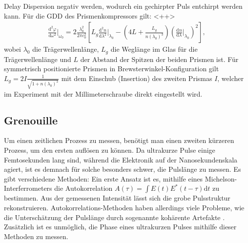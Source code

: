 \documentclass[twoside,        %
               BCOR12mm,       %
               english,ngerman, %
               fleqn,headsepline=false,footsepline=false
              ]{Vorlage/MFPREPORT}
\renewcommand{\d}{\ensuremath{\mathrm{d}}} %
\newcommand{\diff}[3][]{\ensuremath{\frac{\d^{#1}#2}{\d#3^{#1}}}} %
\begin{document}
Delay Dispersion negativ werden, wodurch ein gechirpter Puls entchirpt werden
kann. Für die GDD des Prismenkompressors gilt: \cite{Diels2006}<++> 
\begin{align}
    \diff[2]{\varphi}{\omega}|_{\omega_0}=2\frac{\lambda_0^2}{2\pi c_0^2}\left[
    L_g\diff[2]{n}{\lambda}|_{\lambda_0}-(4L+\frac{L_g}{n(\lambda_0)^3})(\diff{n}{\lambda}|_{\lambda_0})^2
    \right],
    \label{eq:pc}
\end{align}
wobei $\lambda_0$ die Trägerwellenlänge, $L_g$ die Weglänge im Glas für die
Trägerwellenlänge und $L$ der Abstand der Spitzen der beiden Prismen ist. Für
symmetrisch positionierte Prismen in Brewsterwinkel-Konfiguration gilt
$L_g=2I\frac{1}{\sqrt{1+n(\lambda_0)^2}}$ mit dem Einschub (Insertion) des
zweiten Prismas $I$, welcher im Experiment mit der Millimeterschraube direkt
eingestellt wird.

\subsection{Grenouille}
Um einen zeitlichen Prozess zu messen, benötigt man einen zweiten kürzeren Prozess, um
den ersten auflösen zu können. Da ultrakurze Pulse einige Femtosekunden lang
sind, während die Elektronik auf der Nanosekundenskala agiert, ist es demnach
für solche besonders schwer, die Pulslänge zu messen. 
Es gibt verschiedene Methoden: Ein erste Ansatz ist es, mithilfe eines
Michelson-Interferrometers die Autokorrelation $A(\tau)=\int E(t)E^*(t-\tau)\d
t$ zu bestimmen. Aus der gemessenen Intensität lässt sich die grobe
Pulsstruktur rekonstruieren. Autokorrelations-Methoden haben allerdings viele
Probleme, wie die Unterschätzung der Pulslänge durch sogenannte kohärente Artefakte
\cite{swampintro}. Zusätzlich ist es unmöglich, die Phase eines ultrakurzen
Pulses mithilfe dieser Methoden zu messen.
\end{document}
